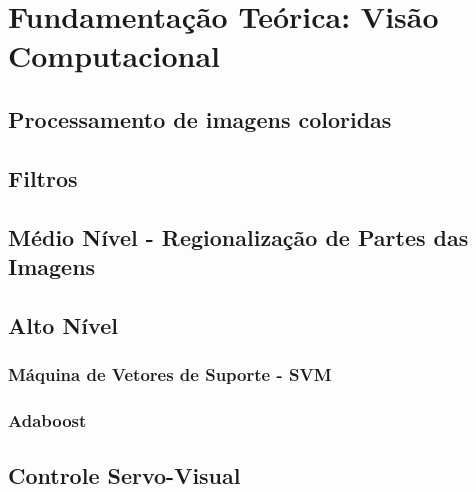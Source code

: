 \documentclass[rascunho]{fei}
\begin{document}
\chapter{Fundamentação Teórica: Visão Computacional}
\label{chap:revision}


\section{Processamento de imagens coloridas}


\section{Filtros}


\section{Médio Nível - Regionalização de Partes das Imagens}



\section{Alto Nível}
	\subsection{Máquina de Vetores de Suporte - SVM}
	

	\subsection{Adaboost}
	

\section{Controle Servo-Visual}



\end{document}
